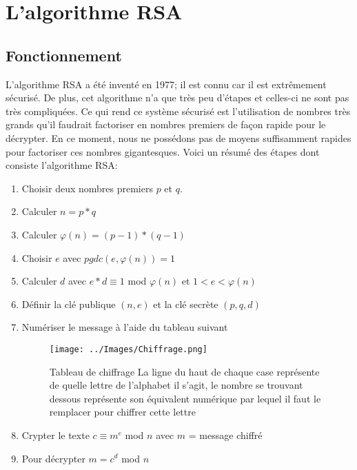 \documentclass[a4paper,12pt]{report}
\begin{document}
     \section{L'algorithme RSA}
      
      \subsection{Fonctionnement}
      
      L'algorithme RSA a été inventé en 1977; il est connu car il est extrêmement sécurisé. De plus, cet algorithme n'a que très peu d'étapes et celles-ci ne sont pas très compliquées. Ce qui rend ce système sécurisé est l'utilisation de nombres très grands qu'il faudrait factoriser en nombres premiers de façon rapide pour le décrypter. En ce moment, nous ne possédons pas de moyens suffisamment rapides pour factoriser ces nombres gigantesques. \newline
      Voici un résumé des étapes dont consiste l'algorithme RSA: \newline
      
      \begin{enumerate}
      \item Choisir deux nombres premiers $p$ et $q$.
      \item Calculer $n = p*q$
      \item Calculer  $\varphi(n) = (p - 1) * (q - 1)$
      \item Choisir $e$ avec $pgdc(e , \varphi(n) ) = 1$
      \item Calculer $d$ avec $e*d \equiv 1$ mod $\varphi(n)$ et $1 < e < \varphi(n)$
      \item Définir la clé publique $(n,e)$ et la clé secrète $(p, q, d)$
      \item Numériser le message à l'aide du tableau suivant
      \begin{figure}[h!]
\begin{center}
\texttt{[image: ../Images/Chiffrage.png]}  
\end{center}
\caption{Tableau de chiffrage \newline
La ligne du haut de chaque case représente de quelle lettre de l'alphabet il s'agit, le nombre se trouvant dessous représente son équivalent numérique par lequel il faut le remplacer pour chiffrer cette lettre}
\end{figure}
      \item Crypter le texte $c \equiv m^{e}$ mod $n$  avec $m$ = message chiffré
      \item Pour décrypter $m = c^{d}$ mod $n$
      \end{enumerate} 
\end{document}
